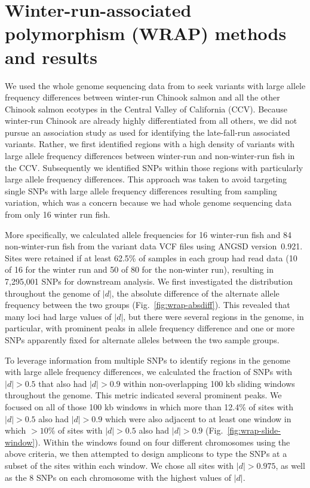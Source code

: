 
\section{Winter-run-associated polymorphism (WRAP) methods and results\label{sec:wrap-methods}}

We used the whole genome sequencing data from \citet{thompson2020complex} to seek variants with
large allele frequency differences between winter-run Chinook salmon and all the other
Chinook salmon ecotypes in the Central Valley of California (CCV).  Because winter-run Chinook are
already highly differentiated from all others, we did not pursue an association study as used
for identifying the late-fall-run associated variants.  Rather, we first identified regions with a high
density of variants with large allele frequency differences between winter-run and non-winter-run
fish in the CCV\@. Subsequently we identified SNPs within those regions with particularly
large allele frequency differences.  This approach was taken to avoid targeting single SNPs
with large allele frequency differences resulting from sampling variation, which was a
concern because we had whole genome sequencing data from only 16 winter run fish.

More specifically, we calculated allele frequencies for 16 winter-run fish and 84 non-winter-run
fish from the  \citet{thompson2020complex} variant data VCF files using ANGSD version~0.921.
Sites were retained if at least 62.5\% of samples in each group had read data (10 of 16 for the
winter run and 50 of 80 for the non-winter run), resulting in 7,295,001 SNPs for downstream
analysis.  We first investigated the distribution throughout the genome of $|d|$, the absolute difference
of the alternate allele frequency between the two groups  (Fig.~\ref{fig:wrap-absdiff}). This revealed
that many loci had large values of $|d|$, but there were several
regions in the genome, in particular, with prominent peaks in allele frequency difference and one
or more SNPs apparently fixed for alternate alleles between the two sample groups.  

To leverage information from multiple SNPs to identify regions in the genome with large
allele frequency differences, we calculated the fraction of SNPs with $|d| > 0.5$ that also
had $|d| > 0.9$ within non-overlapping 100 kb sliding windows throughout the genome. This metric indicated
several prominent peaks.  We focused on all of those
100 kb windows in which more than 12.4\% of sites with $|d|>0.5$ also had $|d|>0.9$ which were
also adjacent to at least one window in which $>10\%$ of sites with $|d|>0.5$ also had $|d|>0.9$ 
(Fig.~\ref{fig:wrap-slide-window}).  Within the windows found on four different chromosomes using
the above criteria, we then attempted to design amplicons to type the SNPs at a subset of the sites
within each window.  We chose all sites with $|d|>0.975$, as well as the 8 SNPs on each chromosome
with the highest values of $|d|$.  



